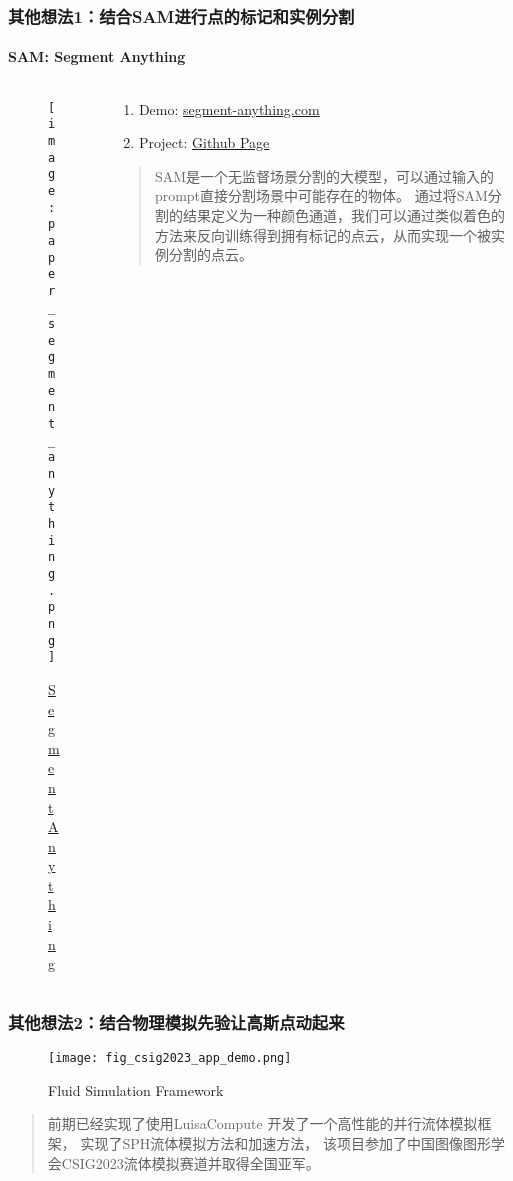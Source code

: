 \begin{frame}
    \frametitle{其他想法1：结合SAM进行点的标记和实例分割}
    \framesubtitle{SAM: Segment Anything}
    \begin{columns}[c] %
        \begin{column}{0.3\textwidth} %
            \begin{figure}
                \texttt{[image: paper\_segment\_anything.png]}
                \caption{\href{https://arxiv.org/abs/2304.02643}{Segment Anything}}
            \end{figure}
        \end{column}
        \begin{column}{0.68\textwidth} %
            \begin{enumerate}
                \item Demo: \href{https://segment-anything.com/demo}{segment-anything.com}
                \item Project: \href{https://github.com/facebookresearch/segment-anything}{Github Page}
            \end{enumerate}
            \begin{quote}
                SAM是一个无监督场景分割的大模型，可以通过输入的prompt直接分割场景中可能存在的物体。
                通过将SAM分割的结果定义为一种颜色通道，我们可以通过类似着色的方法来反向训练得到拥有标记的点云，从而实现一个被实例分割的点云。
            \end{quote}
        \end{column}
    \end{columns}
\end{frame}

\begin{frame}
    \frametitle{其他想法2：结合物理模拟先验让高斯点动起来}
    \begin{figure}
        \texttt{[image: fig\_csig2023\_app\_demo.png]}
        \caption[short]{Fluid Simulation Framework}
    \end{figure}
    \begin{quote}
        前期已经实现了使用LuisaCompute \cite{zhengLuisaRenderHighPerformanceRendering2022} 开发了一个高性能的并行流体模拟框架，
        实现了SPH\cite{priceSmoothedParticleHydrodynamics2012}流体模拟方法和加速方法\cite{huangGeneralNovelParallel2019}，
        该项目参加了中国图像图形学会CSIG2023流体模拟赛道并取得全国亚军。
    \end{quote}
\end{frame}